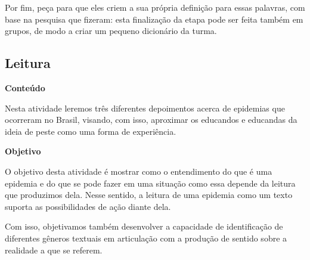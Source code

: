 \documentclass[12pt]{extarticle}
\begin{document}
Por fim, peça para que eles criem a sua própria definição para essas
palavras, com base na pesquisa que fizeram: esta finalização da etapa
pode ser feita também em grupos, de modo a criar um pequeno dicionário
da turma.

\subsection{Leitura}



\textbf{Conteúdo}

Nesta atividade leremos três diferentes depoimentos acerca de epidemias
que ocorreram no Brasil, visando, com isso, aproximar os educandos e
educandas da ideia de peste como uma forma de experiência.

\textbf{Objetivo}

O objetivo desta atividade é mostrar como o entendimento do que é uma
epidemia e do que se pode fazer em uma situação como essa depende da
leitura que produzimos dela. Nesse sentido, a leitura de uma epidemia
como um texto suporta as possibilidades de ação diante dela.

Com isso, objetivamos também desenvolver a capacidade de identificação
de diferentes gêneros textuais em articulação com a produção de sentido
sobre a realidade a que se referem.
\end{document}
